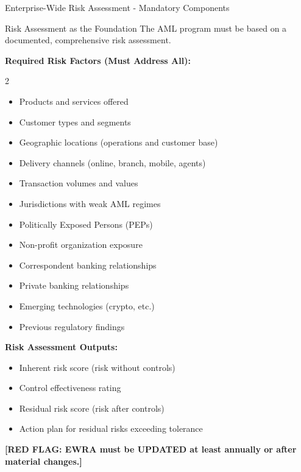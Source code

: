 \documentclass[11pt,a4paper]{beamer}
\newcommand{\redflag}[1]{\textcolor{red!80!black}{\textbf{[RED FLAG: #1]}}}
\begin{document}
	\begin{frame}{Enterprise-Wide Risk Assessment - Mandatory Components}
		\begin{block}{Risk Assessment as the Foundation}
			The AML program must be based on a documented, comprehensive risk assessment.
		\end{block}
		\textbf{Required Risk Factors (Must Address All):}
		\begin{multicols}{2}
			\begin{itemize}
				\item Products and services offered
				\item Customer types and segments
				\item Geographic locations (operations and customer base)
				\item Delivery channels (online, branch, mobile, agents)
				\item Transaction volumes and values
				\item Jurisdictions with weak AML regimes
				\item Politically Exposed Persons (PEPs)
				\item Non-profit organization exposure
				\item Correspondent banking relationships
				\item Private banking relationships
				\item Emerging technologies (crypto, etc.)
				\item Previous regulatory findings
			\end{itemize}
		\end{multicols}
		\textbf{Risk Assessment Outputs:}
		\begin{itemize}
			\item Inherent risk score (risk without controls)
			\item Control effectiveness rating
			\item Residual risk score (risk after controls)
			\item Action plan for residual risks exceeding tolerance
		\end{itemize}
		\redflag{EWRA must be UPDATED at least annually or after material changes.}
	\end{frame}
	
\end{document}
